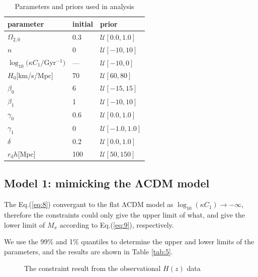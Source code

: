 \documentclass[twocolumn]{aastex631}
\begin{document}
   \begin{table}[htbp]
      \caption{Parameters and priors used in analysis}
      \centering
      \begin{tabular}{lll}
         \hline\hline
         parameter & initial & prior \\
         \hline
         $\Omega_{2,0}$ & 0.3 & $\mathcal{U}[0.0,1.0]$ \\
         $n$ & 0 & $\mathcal{U}[-10,10]$ \\
         $\log_{10}(\kappa C_1/$Gyr${}^{-1})$ & --- & $\mathcal{U}[-10,0]$ \\
         $H_0$[km/s/Mpc] & 70 & $\mathcal{U}[60,80]$ \\
         \hline
         $\beta_0$ & 6 & $\mathcal{U}[-15,15]$ \\
         $\beta_1$ & 1 & $\mathcal{U}[-10,10]$ \\
         $\gamma_0$ & 0.6 & $\mathcal{U}[0.0,1.0]$ \\
         $\gamma_1$ & 0 & $\mathcal{U}[-1.0,1.0]$ \\         
         $\delta$ & 0.2 & $\mathcal{U}[0.0,1.0]$ \\
         \hline
         $r_{\text{d}}h$[Mpc] & 100 & $\mathcal{U}[50,150]$ \\
         \hline
      \end{tabular}
      \label{tab:4}
   \end{table}

\subsection{Model 1: mimicking the ΛCDM model}

   The Eq.(\ref{eq:8}) convergant to the flat ΛCDM model as
   $\log_{10}(\kappa C_1)\to-\infty$, therefore the constraints
   could only give the upper limit of what, and give the lower limit
   of $M_x$ according to Eq.(\ref{eq:9}), respectively.

   We use the 99\% and 1\% quantiles to determine the upper and lower
   limits of the parameters, and the results are shown in Table \ref{tab:5}.

   \begin{figure}[htbp]
      \centering
      \caption{The constraint result from the observational
      $H(z)$ data}
   \end{figure}
\end{document}
